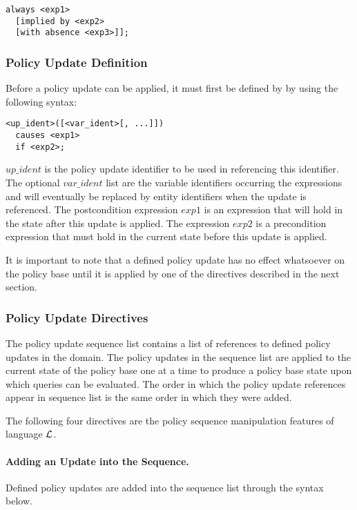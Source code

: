 \documentclass[10pt, twocolumn]{article}
\begin{document}
\begin{verbatim}
always <exp1>
  [implied by <exp2>
  [with absence <exp3>]];
\end{verbatim}

      \subsubsection{Policy Update Definition}

        Before a policy update can be applied, it must first be defined by
        by using the following syntax:

\begin{verbatim}
<up_ident>([<var_ident>[, ...]])
  causes <exp1>
  if <exp2>;
\end{verbatim}

        $up\_ident$ is the policy update identifier to be used in referencing
        this identifier. The optional $var\_ident$ list are the variable
        identifiers occurring the expressions and will eventually be replaced
        by entity identifiers when the update is referenced. The postcondition
        expression $exp1$ is an expression that will hold in the state after
        this update is applied. The expression $exp2$ is a precondition
        expression that must hold in the current state before this update is
        applied.

        It is important to note that a defined policy update has no effect
        whatsoever on the policy base until it is applied by one of the
        directives described in the next section.

      \subsubsection{Policy Update Directives}

        The policy update sequence list contains a list of references to
        defined policy updates in the domain. The policy updates in the
        sequence list are applied to the current state of the policy base one
        at a time to produce a policy base state upon which queries can be
        evaluated. The order in which the policy update references appear in
        sequence list is the same order in which they were added.

        The following four directives are the policy sequence manipulation
        features of language $\cal{L}$.

        \paragraph{Adding an Update into the Sequence.}
          Defined policy updates are added into the sequence list through the
          syntax below.
\end{document}
